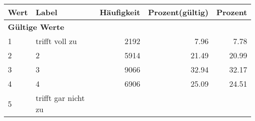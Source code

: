      \begin{longtable}{lXrrr}
     \toprule
     \textbf{Wert} & \textbf{Label} & \textbf{Häufigkeit} & \textbf{Prozent(gültig)} & \textbf{Prozent} \\
     \endhead
     \midrule
     \multicolumn{5}{l}{\textbf{Gültige Werte}}\\

     1 &
     \multicolumn{1}{X}{ trifft voll zu   } &


       \num{2192} &
       \num[round-mode=places,round-precision=2]{7.96} &
         \num[round-mode=places,round-precision=2]{7.78} \\

     2 &
     \multicolumn{1}{X}{ 2   } &


       \num{5914} &
       \num[round-mode=places,round-precision=2]{21.49} &
         \num[round-mode=places,round-precision=2]{20.99} \\

     3 &
     \multicolumn{1}{X}{ 3   } &


       \num{9066} &
       \num[round-mode=places,round-precision=2]{32.94} &
         \num[round-mode=places,round-precision=2]{32.17} \\

     4 &
     \multicolumn{1}{X}{ 4   } &


       \num{6906} &
       \num[round-mode=places,round-precision=2]{25.09} &
         \num[round-mode=places,round-precision=2]{24.51} \\

     5 &
     \multicolumn{1}{X}{ trifft gar nicht zu   } &



\end{longtable}
